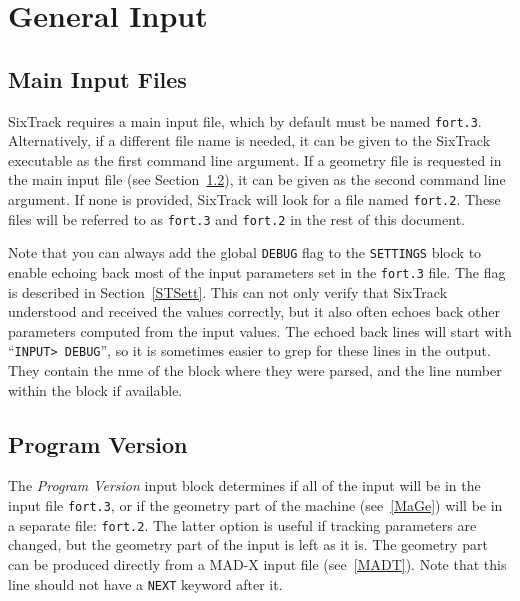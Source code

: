 
\chapter{General Input} \label{GenInp}

\section{Main Input Files} \label{InFiles}

SixTrack requires a main input file, which by default must be named \texttt{fort.3}.
Alternatively, if a different file name is needed, it can be given to the SixTrack executable as the first command line argument.
If a geometry file is requested in the main input file (see Section~\ref{ProVer}), it can be given as the second command line argument.
If none is provided, SixTrack will look for a file named \texttt{fort.2}.
These files will be referred to as \texttt{fort.3} and \texttt{fort.2} in the rest of this document.

\bigskip
Note that you can always add the global \texttt{DEBUG} flag to the \texttt{SETTINGS} block to enable echoing back most of the input parameters set in the \texttt{fort.3} file.
The flag is described in Section~\ref{STSett}.
This can not only verify that SixTrack understood and received the values correctly, but it also often echoes back other parameters computed from the input values.
The echoed back lines will start with ``\texttt{INPUT> DEBUG}'', so it is sometimes easier to grep for these lines in the output.
They contain the nme of the block where they were parsed, and the line number within the block if available.

\section{Program Version} \label{ProVer}

The \textit{Program Version} input block determines if all of the input will be in the input file \texttt{fort.3}, or if the geometry part of the machine (see~\ref{MaGe}) will be in a separate file: \texttt{fort.2}.
The latter option is useful if tracking parameters are changed, but the geometry part of the input is left as it is.
The geometry part can be produced directly from a MAD-X input file (see~\ref{MADT}).
Note that this line should not have a \texttt{NEXT} keyword after it.

